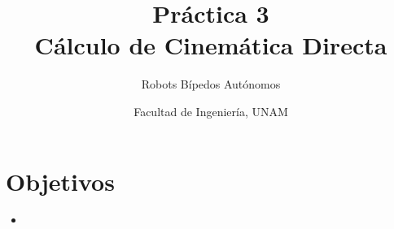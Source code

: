\documentclass[letterpaper,12pt]{article}
\title{Práctica 3 \\ Cálculo de Cinemática Directa}
\author{Robots Bípedos Autónomos}
\date{Facultad de Ingeniería, UNAM}
\begin{document}
\renewcommand{\tablename}{Tabla}
\maketitle
\section*{Objetivos}
\begin{itemize}
\item 
\end{itemize}
\end{document}
